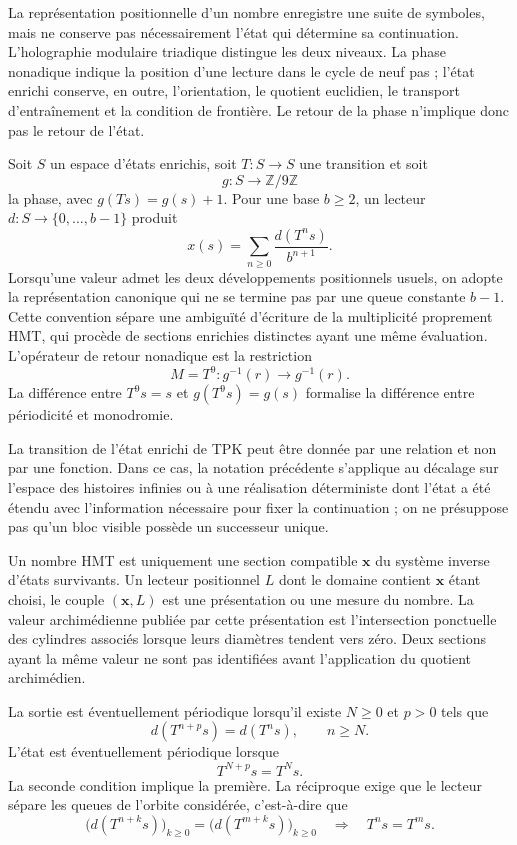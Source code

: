 \label{chap:taxonomia-monodromia}

La représentation positionnelle d'un nombre enregistre une suite de symboles,
mais ne conserve pas nécessairement l'état qui détermine sa continuation.
L'holographie modulaire triadique distingue les deux niveaux. La phase nonadique indique
la position d'une lecture dans le cycle de neuf pas ; l'état
enrichi conserve, en outre, l'orientation, le quotient euclidien, le transport
d'entraînement et la condition de frontière. Le retour de la phase n'implique donc pas
le retour de l'état.

Soit \(S\) un espace d'états enrichis, soit
\(T:S\to S\) une transition et soit
\[
g:S\longrightarrow\mathbb Z/9\mathbb Z
\]
la phase, avec \(g(Ts)=g(s)+1\). Pour une base \(b\geq2\), un lecteur
\(d:S\to\{0,\ldots,b-1\}\) produit
\[
x(s)=\sum_{n\geq0}\frac{d(T^ns)}{b^{n+1}}.
\]
Lorsqu'une valeur admet les deux développements positionnels usuels, on adopte la
représentation canonique qui ne se termine pas par une queue constante \(b-1\). Cette
convention sépare une ambiguïté d'écriture de la multiplicité proprement
HMT, qui procède de sections enrichies distinctes ayant une même
évaluation.
L'opérateur de retour nonadique est la restriction
\[
M=T^9:g^{-1}(r)\longrightarrow g^{-1}(r).
\]
La différence entre \(T^9s=s\) et \(g(T^9s)=g(s)\) formalise la différence
entre périodicité et monodromie.

La transition de l'état enrichi de TPK peut être donnée par une relation et non par une
fonction. Dans ce cas, la notation précédente s'applique au décalage sur
l'espace des histoires infinies ou à une réalisation déterministe dont l'état
a été étendu avec l'information nécessaire pour fixer la continuation ; on ne
présuppose pas qu'un bloc visible possède un successeur unique.

\begin{definition}
Un nombre HMT est uniquement une section compatible
\(\boldsymbol x\) du système inverse d'états survivants. Un
lecteur positionnel \(L\) dont le domaine contient \(\boldsymbol x\) étant choisi, le couple
\((\boldsymbol x,L)\) est une présentation ou une mesure du nombre. La valeur
archimédienne publiée par cette présentation est l'intersection ponctuelle des
cylindres associés lorsque leurs diamètres tendent vers zéro. Deux sections ayant la
même valeur ne sont pas identifiées avant l'application du quotient archimédien.
\end{definition}

\begin{definition}
La sortie est éventuellement périodique lorsqu'il existe \(N\geq0\) et \(p>0\)
tels que
\[
d(T^{n+p}s)=d(T^ns),\qquad n\geq N.
\]
L'état est éventuellement périodique lorsque
\[
T^{N+p}s=T^Ns.
\]
La seconde condition implique la première. La réciproque exige que le lecteur
sépare les queues de l'orbite considérée, c'est-à-dire que
\[
 \bigl(d(T^{n+k}s)\bigr)_{k\geq0}
 =\bigl(d(T^{m+k}s)\bigr)_{k\geq0}
 \quad\Longrightarrow\quad T^ns=T^ms.
\]
\end{definition}

